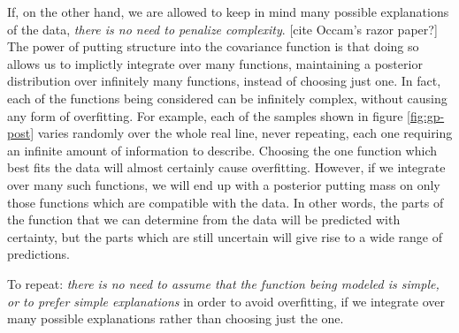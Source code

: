 If, on the other hand, we are allowed to keep in mind many possible explanations of the data, \emph{there is no need to penalize complexity}. [cite Occam's razor paper?]
The power of putting structure into the covariance function is that doing so allows us to implictly integrate over many functions, maintaining a posterior distribution over infinitely many functions, instead of choosing just one.
In fact, each of the functions being considered can be infinitely complex, without causing any form of overfitting.
For example, each of the samples shown in figure \ref{fig:gp-post} varies randomly over the whole real line, never repeating, each one requiring an infinite amount of information to describe.
Choosing the one function which best fits the data will almost certainly cause overfitting.
However, if we integrate over many such functions, we will end up with a posterior putting mass on only those functions which are compatible with the data.
In other words, the parts of the function that we can determine from the data will be predicted with certainty, but the parts which are still uncertain will give rise to a wide range of predictions.

To repeat: \emph{there is no need to assume that the function being modeled is simple, or to prefer simple explanations} in order to avoid overfitting, if we integrate over many possible explanations rather than choosing just the one.




